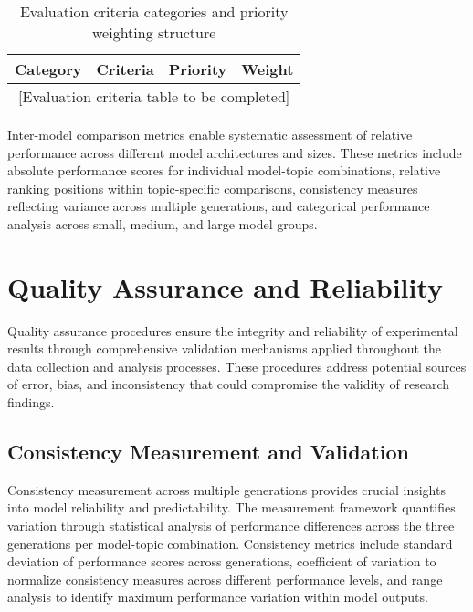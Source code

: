 \begin{table}[htbp]
    \centering
    \caption{Evaluation criteria categories and priority weighting structure}
    \label{tab:evaluation-criteria}
    \begin{tabular}{|l|l|c|l|}
    \hline
    \textbf{Category} & \textbf{Criteria} & \textbf{Priority} & \textbf{Weight} \\
    \hline
    \multicolumn{4}{|c|}{[Evaluation criteria table to be completed]} \\
    \hline
    \end{tabular}
\end{table}

Inter-model comparison metrics enable systematic assessment of relative performance across different model architectures and sizes. These metrics include absolute performance scores for individual model-topic combinations, relative ranking positions within topic-specific comparisons, consistency measures reflecting variance across multiple generations, and categorical performance analysis across small, medium, and large model groups.

\section{Quality Assurance and Reliability}
\label{sec:quality-assurance}

Quality assurance procedures ensure the integrity and reliability of experimental results through comprehensive validation mechanisms applied throughout the data collection and analysis processes. These procedures address potential sources of error, bias, and inconsistency that could compromise the validity of research findings.

\subsection{Consistency Measurement and Validation}

Consistency measurement across multiple generations provides crucial insights into model reliability and predictability. The measurement framework quantifies variation through statistical analysis of performance differences across the three generations per model-topic combination. Consistency metrics include standard deviation of performance scores across generations, coefficient of variation to normalize consistency measures across different performance levels, and range analysis to identify maximum performance variation within model outputs.

